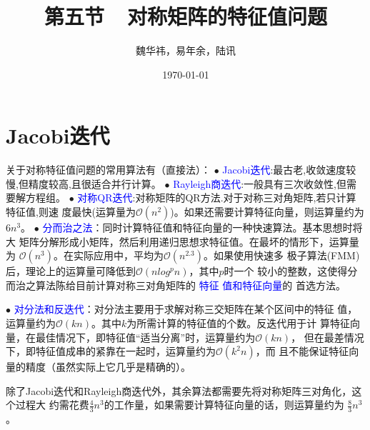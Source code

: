 \documentclass[notheorems,serif]{beamer}
\begin{document}
\title[]{第五节~~对称矩阵的特征值问题}
\author[]{魏华祎，易年余，陆讯}
\date{\today}
\frame[plain]{\titlepage}

\section{Jacobi迭代}
\begin{frame}
关于对称特征值问题的常用算法有（直接法）：
$\bullet$ \textcolor{blue}{Jacobi迭代}:最古老,收敛速度较慢,但精度较高,且很适合并行计算。
$\bullet$ \textcolor{blue}{Rayleigh商迭代}:一般具有三次收敛性,但需要解方程组。
$\bullet$ \textcolor{blue}{对称QR迭代}:对称矩阵的QR方法.对于对称三对角矩阵,若只计算特征值,则速
	度最快(运算量为$\mathcal O(n^2)$)。如果还需要计算特征向量，则运算量约为$6n^3$。
$\bullet$ \textcolor{blue}{分而治之法}：同时计算特征值和特征向量的一种快速算法。基本思想时将大
	矩阵分解形成小矩阵，然后利用递归思想求特征值。在最坏的情形下，运算量为
	$\mathcal O(n^3)$。在实际应用中，平均为$\mathcal O(n^{2.3})$。如果使用快速多
	极子算法(FMM)后，理论上的运算量可降低到$\mathcal O(nlog^p n)$，其中$p$时一个
	较小的整数，这使得分而治之算法陈给目前计算对称三对角矩阵的 \textcolor{blue}{特征
		值和特征向量}的
	首选方法。
\end{frame}
\begin{frame}
$\bullet$ \textcolor{blue}{对分法和反迭代}：对分法主要用于求解对称三交矩阵在某个区间中的特征
	值，运算量约为$\mathcal O(kn)$。其中$k$为所需计算的特征值的个数。反迭代用于计
	算特征向量，在最佳情况下，即特征值“适当分离”时，运算量约为$\mathcal O(kn)$，
	但在最差情况下，即特征值成串的紧靠在一起时，运算量约为$\mathcal O(k^2n)$，而
	且不能保证特征向量的精度（虽然实际上它几乎是精确的）。


\qquad 除了Jacobi迭代和Rayleigh商迭代外，其余算法都需要先将对称矩阵三对角化，这个过程大
约需花费$\frac{4}{3} n^3$的工作量，如果需要计算特征向量的话，则运算量约为
$\frac{8}{3}n^3$。
\end{frame}
\end{document}
